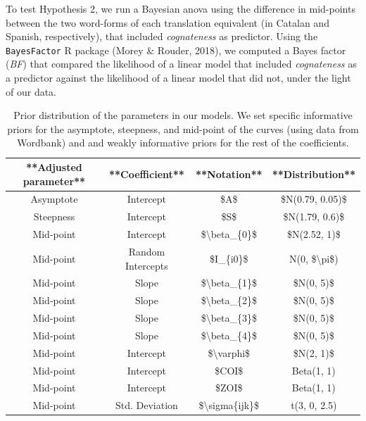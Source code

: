 \documentclass[english,man,man,floatsintext]{apa6}
\begin{document}
To test Hypothesis 2, we run a Bayesian anova using the difference in mid-points between the two word-forms of each translation equivalent (in Catalan and Spanish, respectively), that included \emph{cognateness} as predictor. Using the \texttt{BayesFactor} R package (Morey \& Rouder, 2018), we computed a Bayes factor (\emph{BF}) that compared the likelihood of a linear model that included \emph{cognateness} as a predictor against the likelihood of a linear model that did not, under the light of our data.

\begin{table}

\caption{\label{tab:priorstab}Prior distribution of the parameters in our models. We set specific informative priors for the asymptote, steepness, and mid-point of the curves (using data from Wordbank) and and weakly informative priors for the rest of the coefficients.}
\centering
\begin{tabular}[t]{c|c|c|c}
\hline
**Adjusted parameter** & **Coefficient** & **Notation** & **Distribution**\\
\hline
Asymptote & Intercept & \$A\$ & \$N(0.79, 0.05)\$\\
\hline
Steepness & Intercept & \$S\$ & \$N(1.79, 0.6)\$\\
\hline
Mid-point & Intercept & \$\textbackslash{}beta\_\{0\}\$ & \$N(2.52, 1)\$\\
\hline
Mid-point & Random Intercepts & \$I\_\{i0\}\$ & N(0, \$\textbackslash{}pi\$)\\
\hline
Mid-point & Slope & \$\textbackslash{}beta\_\{1\}\$ & \$N(0, 5)\$\\
\hline
Mid-point & Slope & \$\textbackslash{}beta\_\{2\}\$ & \$N(0, 5)\$\\
\hline
Mid-point & Slope & \$\textbackslash{}beta\_\{3\}\$ & \$N(0, 5)\$\\
\hline
Mid-point & Slope & \$\textbackslash{}beta\_\{4\}\$ & \$N(0, 5)\$\\
\hline
Mid-point & Intercept & \$\textbackslash{}varphi\$ & \$N(2, 1)\$\\
\hline
Mid-point & Intercept & \$COI\$ & Beta(1, 1)\\
\hline
Mid-point & Intercept & \$ZOI\$ & Beta(1, 1)\\
\hline
Mid-point & Std. Deviation & \$\textbackslash{}sigma\{ijk\}\$ & t(3, 0, 2.5)\\
\hline
\end{tabular}
\end{table}
\end{document}
